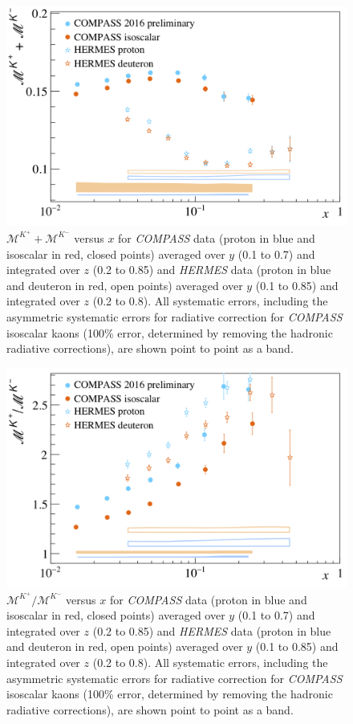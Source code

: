 \documentclass[letterpaper,12pt]{article}
\begin{document}
\begin{figure}[H]
	\centering
	\includegraphics[scale=0.55]{./gfx/Ks.png}
	\caption{$\mathscr{M}^{K^+}+\mathscr{M}^{K^-}$ versus $x$ for \textit{COMPASS} data (proton in blue and isoscalar in red, closed points) averaged over $y$ (0.1 to 0.7) and integrated over $z$ (0.2 to 0.85) and \textit{HERMES} data \cite{HERMES} (proton in blue and deuteron in red, open points) averaged over $y$ (0.1 to 0.85) and integrated over $z$ (0.2 to 0.8). All systematic errors, including the asymmetric systematic errors for radiative correction for \textit{COMPASS} isoscalar kaons (100\% error, determined by removing the hadronic radiative corrections), are shown point to point as a band.}
	\label{Ks}
\end{figure}

\begin{figure}[H]
	\centering
	\includegraphics[scale=0.55]{./gfx/Kr.png}
	\caption{$\mathscr{M}^{K^+}/\mathscr{M}^{K^-}$ versus $x$ for \textit{COMPASS} data (proton in blue and isoscalar in red, closed points) averaged over $y$ (0.1 to 0.7) and integrated over $z$ (0.2 to 0.85) and \textit{HERMES} data \cite{HERMES} (proton in blue and deuteron in red, open points) averaged over $y$ (0.1 to 0.85) and integrated over $z$ (0.2 to 0.8). All systematic errors, including the asymmetric systematic errors for radiative correction for \textit{COMPASS} isoscalar kaons (100\% error, determined by removing the hadronic radiative corrections), are shown point to point as a band.}
	\label{Kr}
\end{figure}
\end{document}
